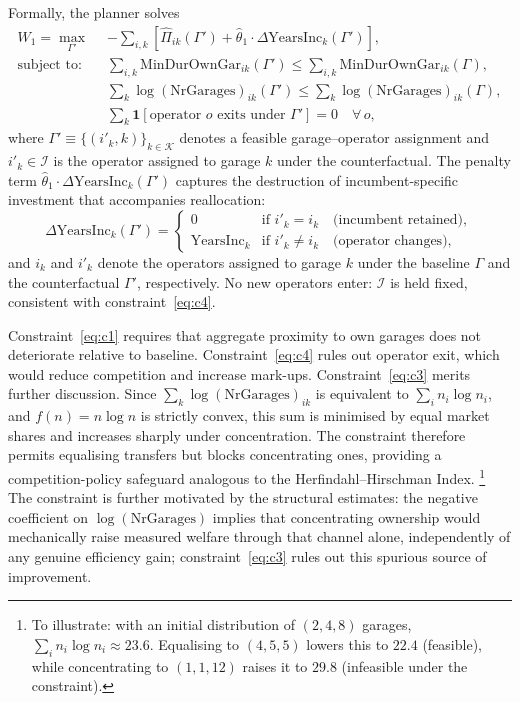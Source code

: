 \documentclass[12pt]{article}
\begin{document}
Formally, the planner solves
%
\begin{align}
  \label{eq:planner}
  W_1 = \max_{\Gamma'} \; &
    -\sum_{i,k} \left[
      \hat{\Pi}_{ik}(\Gamma')
      + \hat{\theta}_1 \cdot \Delta\mathrm{YearsInc}_{k}(\Gamma')
    \right], \\
  \text{subject to:}\quad
    & \sum_{i,k} \mathrm{MinDurOwnGar}_{ik}(\Gamma')
      \leq \sum_{i,k} \mathrm{MinDurOwnGar}_{ik}(\Gamma),
      \label{eq:c1} \\
    & \sum_{k} \log(\mathrm{NrGarages})_{ik}(\Gamma')
      \leq \sum_{k} \log(\mathrm{NrGarages})_{ik}(\Gamma),
      \label{eq:c3} \\
    & \sum_{k} \mathbf{1}[\text{operator } o \text{ exits under } \Gamma'] = 0
      \quad \forall\, o,
      \label{eq:c4}
\end{align}
%
where $\Gamma' \equiv \{(i'_k, k)\}_{k \in \mathcal{K}}$ denotes a feasible
garage--operator assignment and $i'_k \in \mathcal{I}$ is the operator
assigned to garage $k$ under the counterfactual. The penalty term
$\hat{\theta}_1 \cdot \Delta\mathrm{YearsInc}_{k}(\Gamma')$ captures the
destruction of incumbent-specific investment that accompanies reallocation:
%
\begin{equation}
  \Delta\mathrm{YearsInc}_{k}(\Gamma') =
  \begin{cases}
    0 & \text{if } i'_k = i_k \quad \text{(incumbent retained)}, \\
    \mathrm{YearsInc}_{k} & \text{if } i'_k \neq i_k \quad \text{(operator
    changes)},
  \end{cases}
\end{equation}
%
and $i_k$ and $i'_k$ denote the operators assigned to garage $k$ under the
baseline $\Gamma$ and the counterfactual $\Gamma'$, respectively. No new
operators enter: $\mathcal{I}$ is held fixed, consistent with
constraint~\eqref{eq:c4}.
 
Constraint~\eqref{eq:c1} requires that aggregate proximity to own garages does
not deteriorate relative to baseline. Constraint~\eqref{eq:c4} rules out
operator exit, which would reduce competition and increase mark-ups.
Constraint~\eqref{eq:c3} merits further discussion. Since
$\sum_k \log(\mathrm{NrGarages})_{ik}$ is equivalent to
$\sum_i n_i \log n_i$, and $f(n) = n\log n$ is strictly convex, this sum is
minimised by equal market shares and increases sharply under concentration. The
constraint therefore permits equalising transfers but blocks concentrating
ones, providing a competition-policy safeguard analogous to the
Herfindahl--Hirschman Index.%
\footnote{To illustrate: with an initial distribution of $(2,4,8)$ garages,
$\sum_i n_i \log n_i \approx 23.6$. Equalising to $(4,5,5)$ lowers this to
$22.4$ (feasible), while concentrating to $(1,1,12)$ raises it to $29.8$
(infeasible under the constraint).}
The constraint is further motivated by the structural estimates: the negative
coefficient on $\log(\mathrm{NrGarages})$ implies that concentrating ownership
would mechanically raise measured welfare through that channel alone,
independently of any genuine efficiency gain; constraint~\eqref{eq:c3} rules
out this spurious source of improvement.
 
\end{document}
